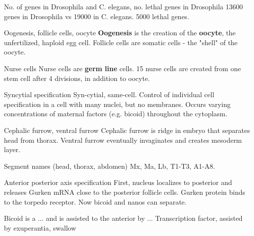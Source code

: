 
\begin{flashcard}{No. of genes in Drosophila and C. elegans, no. lethal genes in Drosophila}
    13600 genes in Drosophila vs 19000 in C. elegans. 5000 lethal genes. 
\end{flashcard}

\begin{flashcard}[Oogenesis]{Oogenesis, follicle cells, oocyte}
    \textbf{Oogenesis} is the creation of the \textbf{oocyte}, the unfertilized, haploid egg cell. Follicle cells are somatic cells - the "shell" of the oocyte. 
\end{flashcard}

\begin{flashcard}[Oogenesis]{Nurse cells}
    Nurse cells are \textbf{germ line} cells. 15 nurse cells are created from one stem cell after 4 divisions, in addition to oocyte.
\end{flashcard}

\begin{flashcard}[Oogenesis]{Syncytial specification}
    Syn-cytial, same-cell. Control of individual cell specification in a cell with many nuclei, but no membranes. Occurs varying concentrations of  maternal factors (e.g. bicoid) throughout the cytoplasm. 
\end{flashcard}

\begin{flashcard}{Cephalic furrow, ventral furrow}
    Cephalic furrow is ridge in embryo that separates head from thorax. Ventral furrow eventually invaginates and creates mesoderm layer. 
\end{flashcard}

\begin{flashcard}{Segment names (head, thorax, abdomen)}
    Mx, Ma, Lb, T1-T3, A1-A8.
\end{flashcard}

\begin{flashcard}{Anterior posterior axis specification}
    First, nucleus localizes to posterior and releases Gurken mRNA close to the posterior follicle cells. Gurken protein binds to the torpedo receptor. Now bicoid and nanos can separate.
\end{flashcard}

\begin{flashcard}{Bicoid is a ... and is assisted to the anterior by ...}
    Transcription factor, assisted by exuperantia, swallow
\end{flashcard}

